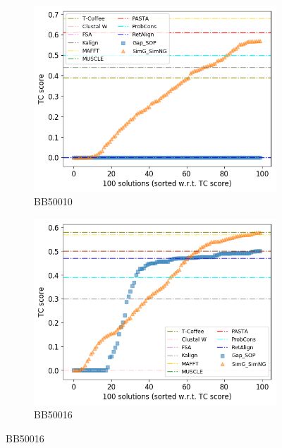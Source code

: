 \begin{figure}[!htbp]
\begin{adjustwidth}{-1cm}{-1cm}
\begin{subfigure}{0.22\textwidth}
		\end{subfigure}
		\begin{subfigure}{0.22\textwidth}
			\includegraphics[width=\columnwidth]{Figure/summary/precomputedInit/Balibase/BB50010_tc_density_single_run_2}
			\caption{BB50010}
		\end{subfigure}
		\begin{subfigure}{0.22\textwidth}
			\includegraphics[width=\columnwidth]{Figure/summary/precomputedInit/Balibase/BB50016_tc_density_single_run_2}
			\caption{BB50016}
		\end{subfigure}
		

\end{adjustwidth}
\end{figure}
